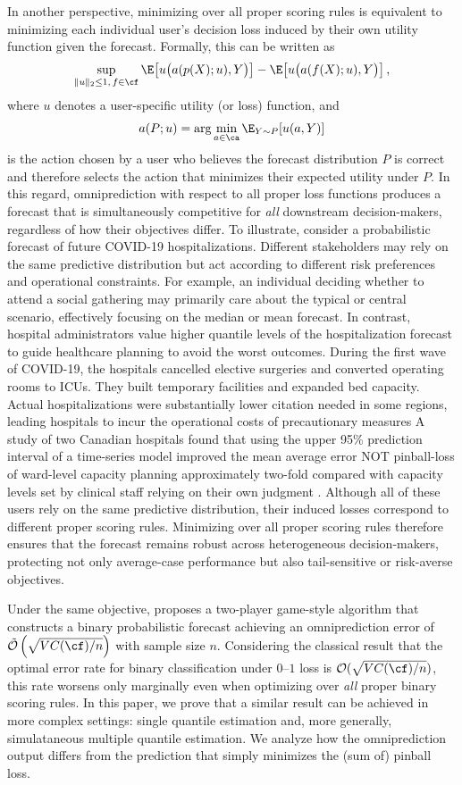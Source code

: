 In another perspective, minimizing over all proper scoring rules is equivalent to minimizing each individual user’s decision loss induced by their own utility function given the forecast. Formally, this can be written as
\[
\sup_{\|u\|_2 \leq 1,\, f\in\cf} 
\E\!\left[u\big(a(p(X);u), Y\big)\right] 
- 
\E\!\left[u\big(a(f(X);u), Y\big)\right],
\]
where $u$ denotes a user-specific utility (or loss) function, and
\[
a(P;u) = \arg\min_{a\in\ca} \E_{Y\sim P}[u(a,Y)]
\]
is the action chosen by a user who believes the forecast distribution $P$ is correct and therefore selects the action that minimizes their expected utility under $P$. In this regard, omniprediction with respect to all proper loss functions produces a forecast that is simultaneously competitive for \emph{all} downstream decision-makers, regardless of how their objectives differ. To illustrate, consider a probabilistic forecast of future COVID-19 hospitalizations. Different stakeholders may rely on the same predictive distribution but act according to different risk preferences and operational constraints. For example, an individual deciding whether to attend a social gathering may primarily care about the typical or central scenario, effectively focusing on the median or mean forecast. 
%
In contrast, hospital administrators value higher quantile levels of the hospitalization forecast to guide healthcare planning to avoid the worst outcomes. During the first wave of COVID-19, the hospitals cancelled elective surgeries and converted operating rooms to ICUs. They built temporary facilities and expanded bed capacity. Actual hospitalizations were substantially lower {\color{red} citation needed} in some regions, leading hospitals to incur the operational costs of precautionary measures
%
A study of two Canadian hospitals found that using the upper 95\% prediction interval
of a time-series model improved the mean average error {\color{red} NOT pinball-loss} of ward-level capacity planning approximately two-fold compared with capacity levels set by clinical staff relying on their own judgment \cite{johnson2023forecasting}.
%
Although all of these users rely on the same predictive distribution, their induced losses correspond to different proper scoring rules. Minimizing over all proper scoring rules therefore ensures that the forecast remains robust across heterogeneous decision-makers, protecting not only average-case performance but also tail-sensitive or risk-averse objectives.

Under the same objective, \cite{isaac2025omni} proposes a two-player game-style algorithm that constructs a binary probabilistic forecast achieving an omniprediction error of $\tilde{\mathcal{O}}\left(\sqrt{VC(\cf)/n}\right)$ with sample size $n$. {\color{blue}Considering the classical result that the optimal error rate for binary classification under $0$–$1$ loss is $\mathcal{O}(\sqrt{VC(\cf)/n})$, this rate worsens only marginally even when optimizing over \textit{all} proper binary scoring rules.} 
In this paper, we prove that a similar result can be achieved in more complex settings: single quantile estimation and, more generally, simulataneous multiple quantile estimation. We analyze how the omniprediction output differs from the prediction that simply minimizes the (sum of) pinball loss.

